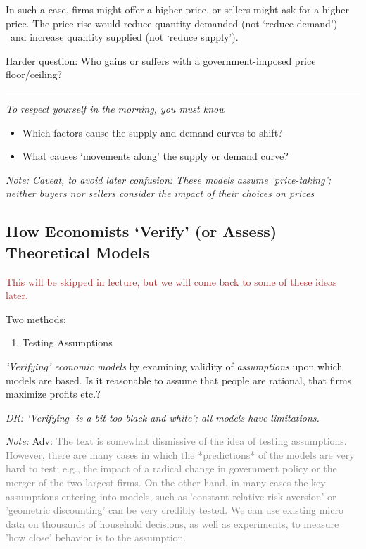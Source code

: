 \documentclass[]{article}
\providecommand{\tightlist}{%
  \setlength{\itemsep}{0pt}\setlength{\parskip}{0pt}}
\begin{document}
In such a case, firms might offer a higher price, or sellers might ask
for a higher price. The price rise would reduce quantity demanded (not
`reduce demand') ~and increase quantity supplied (not `reduce supply').

\bigskip

\textcolor{RawSienna}{Harder question: Who gains or suffers with a government-imposed price floor/ceiling?}

\begin{center}\rule{0.5\linewidth}{\linethickness}\end{center}

\emph{To respect yourself in the morning, you must know}

\begin{itemize}
\item
  Which factors cause the supply and demand curves to shift?
\item
  What causes `movements along' the supply or demand curve?
\end{itemize}

\emph{Note: Caveat, to avoid later confusion: These models assume
`price-taking'; neither buyers nor sellers consider the impact of their
choices on prices}

\hypertarget{how-economists-verify-or-assess-theoretical-models}{%
\subsection{How Economists `Verify' (or Assess) Theoretical
Models}\label{how-economists-verify-or-assess-theoretical-models}}

\textcolor{brown}{This will be skipped in lecture, but we will come back to some of these ideas later.}

Two methods:

\begin{enumerate}
\def\labelenumi{\arabic{enumi}.}
\tightlist
\item
  Testing Assumptions
\end{enumerate}

\emph{`Verifying' economic models} by examining validity of
\emph{assumptions} upon which models are based. Is it reasonable to
assume that people are rational, that firms maximize profits etc.?

\emph{DR: `Verifying' is a bit too black and white'; all models have
limitations.}

\bigskip

\emph{Note:} \textcolor{RawSienna}{Adv:}
\textcolor{gray}{The text is somewhat dismissive of the idea of testing assumptions.  However, there are many cases in which the *predictions* of the models are very hard to test; e.g., the impact of a radical change in government policy or the merger of the two largest firms.  On the other hand, in many cases the key assumptions entering into models, such as 'constant relative risk aversion' or 'geometric discounting' can be very credibly tested.  We can use existing micro data on thousands of household decisions, as well as experiments, to measure 'how close' behavior is to the assumption.}
\end{document}
